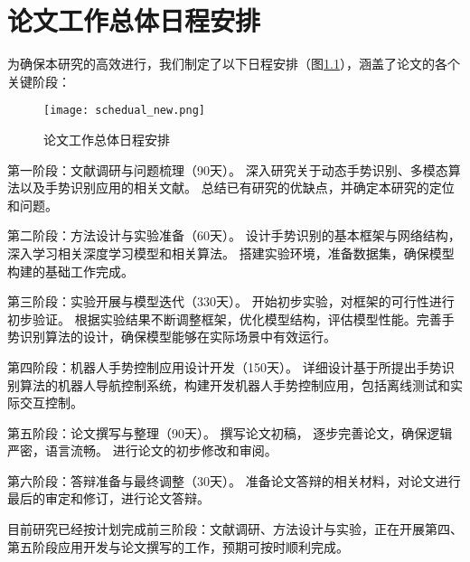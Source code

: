 
\chapter{论文工作总体日程安排}

为确保本研究的高效进行，我们制定了以下日程安排（图\ref{fig:schedual}），涵盖了论文的各个关键阶段：
\begin{figure}
  \centering
  \texttt{[image: schedual\_new.png]}
  \caption{论文工作总体日程安排}
  \label{fig:schedual}
\end{figure}

第一阶段：文献调研与问题梳理（90天）。
深入研究关于动态手势识别、多模态算法以及手势识别应用的相关文献。
总结已有研究的优缺点，并确定本研究的定位和问题。

第二阶段：方法设计与实验准备（60天）。
设计手势识别的基本框架与网络结构，深入学习相关深度学习模型和相关算法。
搭建实验环境，准备数据集，确保模型构建的基础工作完成。

第三阶段：实验开展与模型迭代（330天）。
开始初步实验，对框架的可行性进行初步验证。
根据实验结果不断调整框架，优化模型结构，评估模型性能。完善手势识别算法的设计，确保模型能够在实际场景中有效运行。

第四阶段：机器人手势控制应用设计开发（150天）。
详细设计基于所提出手势识别算法的机器人导航控制系统，构建开发机器人手势控制应用，包括离线测试和实际交互控制。

第五阶段：论文撰写与整理（90天）。
撰写论文初稿，%
逐步完善论文，确保逻辑严密，语言流畅。
进行论文的初步修改和审阅。

第六阶段：答辩准备与最终调整（30天）。
准备论文答辩的相关材料，对论文进行最后的审定和修订，进行论文答辩。

目前研究已经按计划完成前三阶段：文献调研、方法设计与实验，正在开展第四、第五阶段应用开发与论文撰写的工作，预期可按时顺利完成。




